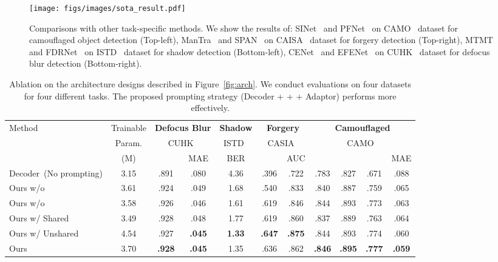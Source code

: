 \begin{figure*}[tp]
    \centering
    \texttt{[image: figs/images/sota\_result.pdf]}
    \caption{Comparisons with other task-specific methods. We show the results  of: 
    SINet~\cite{fan2020camouflaged} and PFNet~\cite{mei2021camouflaged} on CAMO~\cite{le2019anabranch} dataset for camouflaged object detection (Top-left),
    ManTra~\cite{wu2019mantra} and SPAN~\cite{hu2020span} on CAISA~\cite{dong2013casia} dataset for forgery detection (Top-right),
    MTMT~\cite{mtmt} and FDRNet~\cite{zhu2021mitigating} on ISTD~\cite{wang2018stacked} dataset for shadow detection (Bottom-left), CENet~\cite{zhao2019cenet} and EFENet~\cite{zhao2021defocus} on CUHK~\cite{shi2014discriminative} dataset for defocus blur detection (Bottom-right).}
    \label{fig:sota_result}
\end{figure*} \begin{table*}[!t]
\centering
{
\begin{tabular}{l||c|cc|c|cc|cccc}
\toprule
\multirow{3}{*}{Method}& Trainable & \multicolumn{2}{c|}{\textbf{Defocus Blur}} & \textbf{Shadow} & \multicolumn{2}{c|}{\textbf{Forgery }} & \multicolumn{4}{c}{\textbf{Camouflaged}}\\
      & Param.&  \multicolumn{2}{c|}{CUHK~\cite{shi2014discriminative}} & ISTD~\cite{wang2018stacked}& \multicolumn{2}{c|}{CASIA~\cite{dong2013casia}} & \multicolumn{4}{c}{CAMO~\cite{le2019anabranch}}\\ 
      & (M) & & MAE       & BER     &  & AUC   &  &    &   & MAE    \\ \hline
Decoder~(No prompting) & 3.15 & .891 & .080 & 4.36  & .396 & .722  & .783 & .827 & .671 & .088 \\ 
Ours w/o  & 3.61 & .924 & .049 & 1.68  & .540 & .833  & .840 & .887 & .759 & .065 \\ 
Ours w/o  & 3.58 & .926  & .046  & 1.61 & .619   & .846 & .844 & .893 & .773 & .063 \\ 
Ours w/ Shared  & 3.49 & .928   & .048    & 1.77 & .619   & .860 & .837 & .889 & .763 & .064 \\
Ours w/ Unshared  & 4.54 & .927   & \textbf{.045}    & \textbf{1.33} & \textbf{.647}   & \textbf{.875}  & .844 & .893 & .774 & .060 \\ 
Ours & 3.70 & \textbf{.928}  & \textbf{.045}  & 1.35 & .636   & .862 & \textbf{.846} & \textbf{.895} & \textbf{.777} & \textbf{.059} \\ \bottomrule
\end{tabular}}
\caption{Ablation on the architecture designs described in Figure~\ref{fig:arch}. We conduct evaluations on four datasets for four different tasks. The proposed prompting strategy (Decoder +  +  + Adaptor) performs more effectively.}
\label{tab:arch}
\end{table*}



